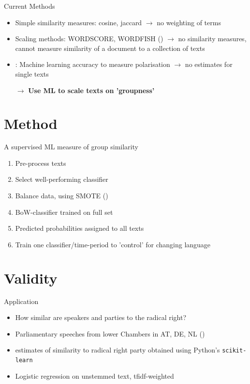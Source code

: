 \documentclass{beamer}
\begin{document}
\begin{frame}{Current Methods}
    \begin{itemize}
        \item Simple similarity measures: cosine, jaccard \newline
        $\rightarrow$ no weighting of terms
        \item Scaling methods: WORDSCORE, WORDFISH (\cite{Laver2003, Slapin2008}) \newline
        $\rightarrow$ no similarity measures, cannot measure similarity of a document to a collection of texts
        \item \cite{Peterson2018}: Machine learning accuracy to measure polarisation
        $\rightarrow$ no estimates for single texts
        \item[$\rightarrow$]\textbf{Use ML to scale texts on 'groupness'}
    \end{itemize}
\end{frame}

\section{Method}

\begin{frame}{A supervised ML measure of group similarity}
    \begin{enumerate}
        \item Pre-process texts
        \item Select well-performing classifier
        \item Balance data, using SMOTE (\cite{Chawla2002})
        \item BoW-classifier trained on full set
        \item Predicted probabilities assigned to all texts
        \item Train one classifier/time-period to 'control' for changing language
    \end{enumerate}
\end{frame}


\section{Validity}
\begin{frame}{Application}
\begin{itemize}
    \item How similar are speakers and parties to the radical right?
    \item Parliamentary speeches from lower Chambers in AT, DE, NL (\cite{Rauh2020})
    \item estimates of similarity to radical right party obtained using Python's \texttt{scikit-learn}
    \item Logistic regression on unstemmed text, tfidf-weighted
\end{itemize}
\end{frame}
\end{document}
